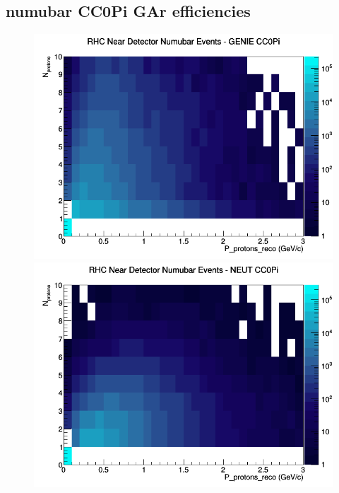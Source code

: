 \documentclass[12pt]{article}
\begin{document}
\subsection{numubar CC0Pi GAr efficiencies}
\begin{figure}[h]
\includegraphics[width=\linewidth]{eff_N_P/GAr/protons/CC0Pi_RHC_ND_numubar_N_P_GENIE.png}
\endminipage
{}
\includegraphics[width=\linewidth]{eff_N_P/GAr/protons/CC0Pi_RHC_ND_numubar_N_P_NEUT.png}
\endminipage
{}

\end{figure}
\end{document}
